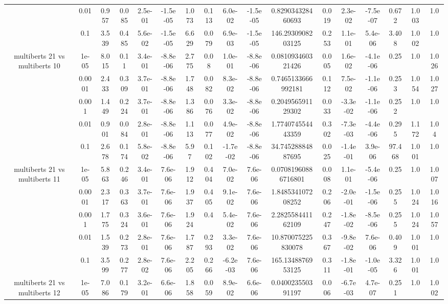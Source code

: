 \begin{tabular}{|c|c|c|c|c|c|c|c|c|c|c|c|c|c|c|c|c|}
 & 0.01 & 0.957 & 0.085 & 2.5e-01 & -1.5e-05 & 1.073 & 0.113 & 6.0e-02 & -1.5e-05 & 0.829034328460693 & 0.019 & 2.3e-02 & -7.5e-07 & 0.672 & 1.003 & 1.0 \\
 & 0.1 & 3.539 & 0.485 & 5.6e-02 & -1.5e-05 & 6.629 & 0.079 & 6.9e-03 & -1.5e-05 & 146.2930908203125 & 0.253 & 1.1e-01 & 5.4e-06 & 3.408 & 1.002 & 1.0 \\
\hline
\multirow{5}{*}{multiberts 21 vs multiberts 10} & 1e-05 & 8.015 & 0.11 & 3.4e-01 & -8.8e-06 & 2.775 & 0.08 & 1.0e-01 & -8.8e-06 & 0.081093460321426 & 0.005 & 1.6e-02 & -4.1e-06 & 0.25 & 1.0 & 1.026 \\
 & 0.0001 & 2.433 & 0.309 & 3.7e-01 & -8.8e-06 & 1.748 & 0.082 & 8.3e-02 & -8.8e-06 & 0.7465133666992181 & 0.112 & 7.5e-02 & -1.1e-06 & 0.253 & 1.054 & 1.027 \\
 & 0.001 & 1.449 & 0.224 & 3.7e-01 & -8.8e-06 & 1.386 & 0.076 & 3.3e-02 & -8.8e-06 & 0.204956591129302 & 0.033 & -3.3e-02 & -1.1e-06 & 0.252 & 1.0 & 1.0 \\
 & 0.01 & 0.901 & 0.084 & 2.8e-01 & -8.8e-06 & 1.113 & 0.077 & 4.9e-02 & -8.8e-06 & 1.774074554443359 & 0.302 & -7.3e-03 & -4.4e-06 & 0.295 & 1.172 & 1.04 \\
 & 0.1 & 2.678 & 0.174 & 5.8e-02 & -8.8e-06 & 5.97 & 0.102 & -1.7e-02 & -8.8e-06 & 34.74528884887695 & 0.025 & -1.4e-01 & 3.9e-06 & 97.468 & 1.001 & 1.0 \\
\hline
\multirow{5}{*}{multiberts 21 vs multiberts 11} & 1e-05 & 5.863 & 0.246 & 3.4e-01 & 7.6e-06 & 1.912 & 0.404 & 7.0e-02 & 7.6e-06 & 0.07081960886716801 & 0.008 & 1.1e-01 & -5.4e-06 & 0.25 & 1.0 & 1.007 \\
 & 0.0001 & 2.317 & 0.363 & 3.7e-01 & 7.6e-06 & 1.937 & 0.405 & 9.1e-02 & 7.6e-06 & 1.848534107208252 & 0.206 & -2.0e-01 & -1.5e-06 & 0.255 & 1.024 & 1.016 \\
 & 0.001 & 1.775 & 0.324 & 3.6e-01 & 7.6e-06 & 1.924 & 0.4 & 5.4e-02 & 7.6e-06 & 2.282558441162109 & 0.247 & -1.8e-02 & -8.5e-06 & 0.255 & 1.024 & 1.057 \\
 & 0.01 & 1.539 & 0.273 & 2.8e-01 & 7.6e-06 & 1.787 & 0.293 & 3.3e-02 & 7.6e-06 & 10.870075225830078 & 0.367 & -9.8e-02 & 7.6e-06 & 0.409 & 1.001 & 1.0 \\
 & 0.1 & 3.599 & 0.277 & 2.8e-02 & 7.6e-06 & 2.205 & 0.266 & -6.2e-03 & 7.6e-06 & 165.1348876953125 & 0.311 & -1.8e-01 & -1.0e-05 & 3.326 & 1.001 & 1.0 \\
\hline
\multirow{5}{*}{multiberts 21 vs multiberts 12} & 1e-05 & 7.086 & 0.179 & 3.2e-01 & 6.6e-06 & 1.858 & 0.059 & 8.9e-02 & 6.6e-06 & 0.040023550391197 & 0.006 & -6.7e-03 & 4.7e-07 & 0.251 & 1.0 & 1.002 \\

\end{tabular}
